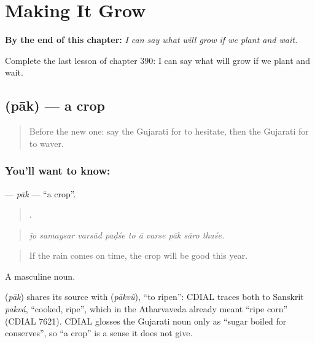 
\chapter{Making It Grow}
\label{ch:gu-making-it-grow}

\begin{chapteropening}
\textbf{By the end of this chapter:} \emph{I can say what will grow if we plant and wait.}

Complete the last lesson of chapter 390: I can say what will grow if we plant and wait.
\end{chapteropening}

\section[\texorpdfstring{\gu{પાક} (pāk)}{પાક (pāk)}]{ (pāk) — a crop}

\label{lesson:GU-C390-pak}



\begin{quote}
Before the new one: say the Gujarati for to hesitate, then the Gujarati for to waver.
\end{quote}

\subsection*{You'll want to know: }
\textbf{} — \emph{pāk} — \textquotedblleft{}a crop\textquotedblright{}.

\begin{quote}
         .
\end{quote}

\begin{quote}
\emph{jo samaysar varsād paḍśe to ā varse pāk sāro thaśe.}
\end{quote}

\begin{quote}
If the rain comes on time, the crop will be good this year.
\end{quote}

A masculine noun.

\begin{cousinweb}
\textbf{} (\emph{pāk}) shares its source with \textbf{} (\emph{pākvũ}), \textquotedblleft{}to ripen\textquotedblright{}: CDIAL traces both to Sanskrit \emph{pakvá}, \textquotedblleft{}cooked, ripe\textquotedblright{}, which in the Atharvaveda already meant \textquotedblleft{}ripe corn\textquotedblright{} (CDIAL 7621). CDIAL glosses the Gujarati noun only as \textquotedblleft{}sugar boiled for conserves\textquotedblright{}, so \textquotedblleft{}a crop\textquotedblright{} is a sense it does not give.
\end{cousinweb}

